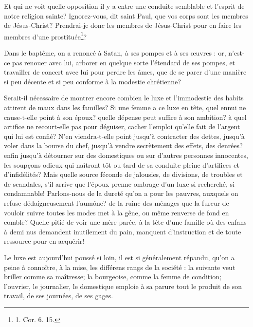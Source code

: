 \documentclass[instructions.tex]{subfiles}
\begin{document}
Et qui ne voit quelle opposition il y a entre une conduite semblable et l'esprit de notre religion sainte? Ignorez-vous, dit saint Paul, que vos corps sont les membres de Jésus-Christ? Prendrai-je donc les membres de Jésus-Christ pour en faire les membres d'une prostituée\footnote{1. Cor. 6. 15.}?
 
Dans le baptême, on a renoncé à Satan, à ses pompes et à ses œuvres : or, n'est-ce pas renouer avec lui, arborer en quelque sorte l'étendard de ses pompes, et travailler de concert avec lui pour perdre les âmes, que de se parer d'une manière si peu décente et si peu conforme à la modestie chrétienne?
 
Serait-il nécessaire de montrer encore combien le luxe et l'immodestie des habits attirent de maux dans les familles? Si une femme a ce luxe en tête, quel ennui ne cause-t-elle point à son époux? quelle dépense peut suffire à son ambition? à quel artifice ne recourt-elle pas pour déguiser, cacher l'emploi qu'elle fait de l'argent qui lui est confié? N'en viendra-t-elle point jusqu'à contracter des dettes, jusqu'à voler dans la bourse du chef, jusqu'à vendre secrètement des effets, des denrées? enfin jusqu'à détourner sur des domestiques ou sur d'autres personnes innocentes, les soupçons odieux qui naîtront tôt ou tard de sa conduite pleine d'artifices et d'infidélités? Mais quelle source féconde de jalousies, de divisions, de troubles et de scandales, s'il arrive que l'époux prenne ombrage d'un luxe si recherché, si condamnable! Parlons-nous de la dureté qu'on a pour les pauvres, auxquels on refuse dédaigneusement l'aumône? de la ruine des ménages que la fureur de vouloir suivre toutes les modes met à la gêne, ou même renverse de fond en comble? Quelle pitié de voir une mère parée, à la tête d'une famille où des enfans à demi nus demandent inutilement du pain, manquent d'instruction et de toute ressource pour en acquérir!
 
Le luxe est aujourd'hui poussé si loin, il est si généralement répandu, qu'on a peine à connoître, à la mise, les différens rangs de la société : la suivante veut briller comme sa maîtresse; la bourgeoise, comme la femme de condition; l'ouvrier, le journalier, le domestique emploie à sa parure tout le produit de son travail, de ses journées, de ses gages.
 
\end{document}
